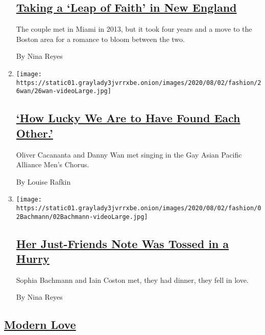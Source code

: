 \begin{enumerate}
{  \subsection{\texorpdfstring{\href{/2020/07/31/fashion/weddings/taking-a-leap-of-faith-in-new-england.html}{Taking
  a `Leap of Faith' in New
  England}}{Taking a `Leap of Faith' in New England}}\label{taking-a-leap-of-faith-in-new-england}}

  The couple met in Miami in 2013, but it took four years and a move to
  the Boston area for a romance to bloom between the two.

  By Nina Reyes
\item
  \texttt{[image: https://static01.graylady3jvrrxbe.onion/images/2020/08/02/fashion/26wan/26wan-videoLarge.jpg]}

  \hypertarget{how-lucky-we-are-to-have-found-each-other}{%
  \subsection{\texorpdfstring{\href{/2020/07/31/fashion/weddings/how-lucky-we-are-to-have-found-each-other.html}{`How
  Lucky We Are to Have Found Each
  Other.'}}{`How Lucky We Are to Have Found Each Other.'}}\label{how-lucky-we-are-to-have-found-each-other}}

  Oliver Cacananta and Danny Wan met singing in the Gay Asian Pacific
  Alliance Men's Chorus.

  By Louise Rafkin
\item
  \texttt{[image: https://static01.graylady3jvrrxbe.onion/images/2020/08/02/fashion/02Bachmann/02Bachmann-videoLarge.jpg]}

  \hypertarget{her-just-friends-note-was-tossed-in-a-hurry}{%
  \subsection{\texorpdfstring{\href{/2020/07/31/fashion/weddings/her-just-friends-note-was-tossed-in-a-hurry.html}{Her
  Just-Friends Note Was Tossed in a
  Hurry}}{Her Just-Friends Note Was Tossed in a Hurry}}\label{her-just-friends-note-was-tossed-in-a-hurry}}

  Sophia Bachmann and Iain Coston met, they had dinner, they fell in
  love.

  By Nina Reyes
\end{enumerate}

\hypertarget{modern-love}{%
\subsection{\texorpdfstring{\href{/column/modern-love}{Modern
Love}}{Modern Love}}\label{modern-love}}

